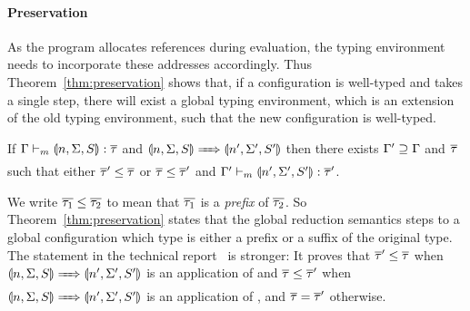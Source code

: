\paragraph{Preservation}
As the program allocates references during evaluation, the typing environment needs to incorporate these addresses accordingly. Thus Theorem~\ref{thm:preservation} shows that, if a configuration is well-typed and takes a single step, there will exist a global typing environment, which is an extension of the old typing environment, such that the new configuration is well-typed.

\begin{theorem}[Preservation]\label{thm:preservation}
If $\hastype[m]{\tenv}{\gconfig{n}{\env}{S}}{\overline{\type}}$ and $\gconfig{n}{\env}{S} \gstepsto \gconfig{n'}{\env'}{S'}$ then there exists $\Gamma' \supseteq \Gamma$ and $\overline{\tau}$ such that either $\overline{\tau}' \leq \overline{\tau}$ or $\overline{\tau} \leq \overline{\tau}'$ and $\hastype[m]{\tenv'}{\gconfig{n'}{\env'}{S'}}{\overline{\type}'}$.
\end{theorem}

We write $\overline{\tau_1} \leq \overline{\tau_2}$ to mean that $\overline{\tau_1}$ is a \emph{prefix} of $\overline{\tau_2}$. So Theorem~\ref{thm:preservation} states that the global reduction semantics steps to a global configuration which type is either a prefix or a suffix of the original type. The statement in the technical report~\cite{techreport} is stronger: It proves that $\overline{\tau}' \leq \overline{\tau}$ when $\gconfig{n}{\env}{S} \gstepsto \gconfig{n'}{\env'}{S'}$ is an application of  and $\overline{\tau} \leq \overline{\tau}'$ when $\gconfig{n}{\env}{S} \gstepsto \gconfig{n'}{\env'}{S'}$ is an application of , and $\overline{\tau} = \overline{\tau}'$ otherwise.

